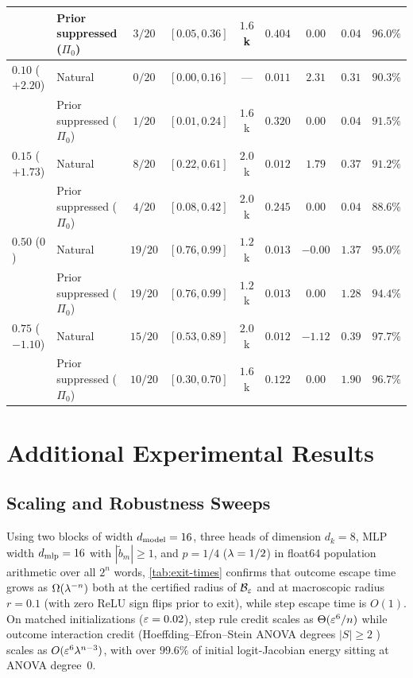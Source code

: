\begin{table}[!htbp]
{\begin{tabular}{@{}llccccccr@{}}
 & Prior suppressed ($\Pi_0$) & $3/20$ & $[0.05, 0.36]$ & $1.6$k & $0.404$ & $0.00$ & $0.04$ & $96.0\%$\\
\midrule
$0.10$ ($+2.20$) & Natural & $0/20$ & $[0.00, 0.16]$ & --- & $0.011$ & $2.31$ & $0.31$ & $90.3\%$\\
 & Prior suppressed ($\Pi_0$) & $1/20$ & $[0.01, 0.24]$ & $1.6$k & $0.320$ & $0.00$ & $0.04$ & $91.5\%$\\
\midrule
$0.15$ ($+1.73$) & Natural & $8/20$ & $[0.22, 0.61]$ & $2.0$k & $0.012$ & $1.79$ & $0.37$ & $91.2\%$\\
 & Prior suppressed ($\Pi_0$) & $4/20$ & $[0.08, 0.42]$ & $2.0$k & $0.245$ & $0.00$ & $0.04$ & $88.6\%$\\
\midrule
$0.50$ ($0$) & Natural & $19/20$ & $[0.76, 0.99]$ & $1.2$k & $0.013$ & $-0.00$ & $1.37$ & $95.0\%$\\
 & Prior suppressed ($\Pi_0$) & $19/20$ & $[0.76, 0.99]$ & $1.2$k & $0.013$ & $0.00$ & $1.28$ & $94.4\%$\\
\midrule
$0.75$ ($-1.10$) & Natural & $15/20$ & $[0.53, 0.89]$ & $2.0$k & $0.012$ & $-1.12$ & $0.39$ & $97.7\%$\\
 & Prior suppressed ($\Pi_0$) & $10/20$ & $[0.30, 0.70]$ & $1.6$k & $0.122$ & $0.00$ & $1.90$ & $96.7\%$\\
\bottomrule
\end{tabular}}
\end{table}

\section{Additional Experimental Results}
\label{app:exp-other}

\subsection{Scaling and Robustness Sweeps}
\label{app:exp-regime}
\label{app:regime}
\label{app:exp-spectra}
\label{app:spectrum}
\label{app:validation-spectra}
\label{app:exp-plateau}
\label{app:tracking}
\label{app:exp-lambda}

Using two blocks of width $d_{\mathrm{model}} = 16$, three heads of dimension $d_k = 8$, MLP width $d_{\mathrm{mlp}} = 16$ with $|\tilde b_m| \ge 1$, and $p = 1/4$ ($\lambda = 1/2$) in float64 population arithmetic over all $2^n$ words, \cref{tab:exit-times} confirms that outcome escape time grows as $\Omega(\lambda^{-n})$ both at the certified radius of $\mathcal B_{\varepsilon}$ and at macroscopic radius $r = 0.1$ (with zero ReLU sign flips prior to exit), while step escape time is $O(1)$. On matched initializations ($\varepsilon = 0.02$), step rule credit scales as $\Theta(\varepsilon^6/n)$ while outcome interaction credit (Hoeffding--Efron--Stein ANOVA degrees $|S| \ge 2$ \citep{hoeffding1948class,efron1981jackknife,odonnell2014analysis}) scales as $O(\varepsilon^6\lambda^{n-3})$, with over $99.6\%$ of initial logit-Jacobian energy sitting at ANOVA degree~$0$.

